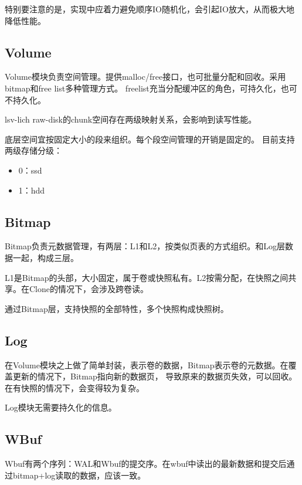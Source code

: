 \documentclass[UTF8]{ctexart}
\begin{document}
特别要注意的是，实现中应着力避免顺序IO随机化，会引起IO放大，从而极大地降低性能。


\subsection{Volume}

Volume模块负责空间管理。提供malloc/free接口，也可批量分配和回收。采用bitmap和free list多种管理方式。
freelist充当分配缓冲区的角色，可持久化，也可不持久化。

lsv-lich raw-disk的chunk空间存在两级映射关系，会影响到读写性能。

底层空间宜按固定大小的段来组织。每个段空间管理的开销是固定的。
目前支持两级存储分级：
\begin{tcolorbox}
    \begin{multicols}{2}
        \begin{itemize}
            \item 0：ssd
            \item 1：hdd
        \end{itemize}
    \end{multicols}
\end{tcolorbox}

\subsection{Bitmap}

Bitmap负责元数据管理，有两层：L1和L2，按类似页表的方式组织。和Log层数据一起，构成三层。

L1是Bitmap的头部，大小固定，属于卷或快照私有。L2按需分配，在快照之间共享。在Clone的情况下，会涉及跨卷读。

通过Bitmap层，支持快照的全部特性，多个快照构成快照树。

\subsection{Log}

在Volume模块之上做了简单封装，表示卷的数据，Bitmap表示卷的元数据。在覆盖更新的情况下，Bitmap指向新的数据页，
导致原来的数据页失效，可以回收。在有快照的情况下，会变得较为复杂。

Log模块无需要持久化的信息。

\subsection{WBuf}

Wbuf有两个序列：WAL和Wbuf的提交序。在wbuf中读出的最新数据和提交后通过bitmap+log读取的数据，应该一致。
\end{document}

